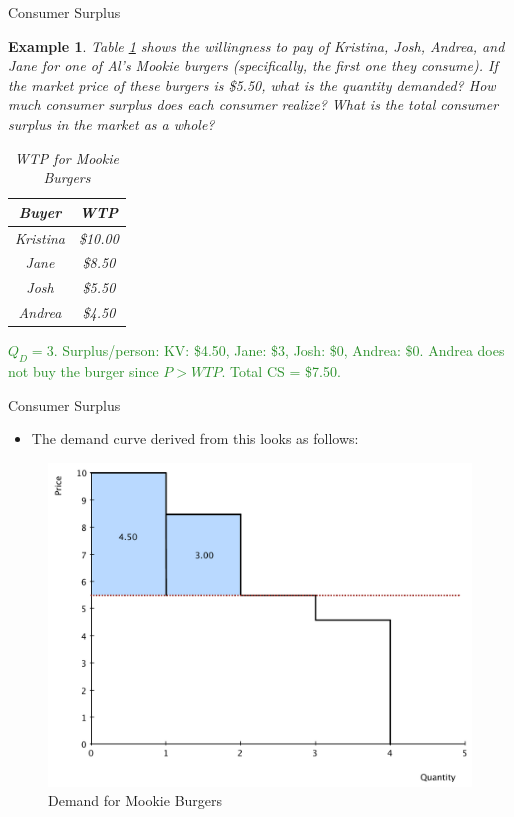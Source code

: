 \documentclass[xcolor={dvipsnames},pdf, hyperref={colorlinks=true, citecolor=ForestGreen, linkcolor=BlueViolet, urlcolor=Magenta}]{beamer}
\newtheorem{exmp}{Example}[section]
\newcommand{\ddp}[1]{{\textcolor{ForestGreen}{#1}}}
\begin{document}
\begin{frame}[t]{Consumer Surplus}
	

	\begin{exmp}
		\scriptsize 
		Table \ref{mookie} shows the willingness to pay of Kristina, Josh, Andrea, and Jane for one of Al's Mookie burgers (specifically, the first one they consume). If the market price of these burgers is \$5.50, what is the quantity demanded? How much consumer surplus does each consumer realize? What is the total consumer surplus in the market as a whole?
		
		\begin{table}[ht]
			\caption{WTP for Mookie Burgers}
			\label{mookie}
			\centering
			\begin{tabular}{  c|c}        
				
				Buyer   & WTP \\
				\hline
				Kristina & \$10.00 \\
				Jane & \$8.50 \\
				Josh & \$5.50 \\
				Andrea & \$4.50 \\
			\end{tabular}
		\end{table} 
	\end{exmp}
	\small
	\ddp{\pause $Q_D = 3$. Surplus/person: KV: \$4.50, Jane: \$3, Josh: \$0, Andrea: \$0. Andrea does not buy the burger since $P>WTP$. Total CS = \$7.50.\\}
	
\end{frame}


\begin{frame}[t]{Consumer Surplus}
\begin{itemize}
	\item The demand curve derived from this looks as follows:
\end{itemize}	
	\begin{figure}[H]
		\centering
		\includegraphics[scale=.25]{plot18.pdf}
		\caption{Demand for Mookie Burgers}
	\end{figure}		
	\end{frame}
\end{document}
